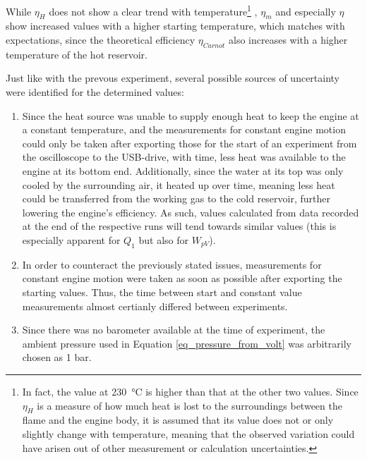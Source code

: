 \documentclass[titlepage]{article}
\begin{document}
While \(\eta_H\) does not show a clear trend with temperature\footnote{In fact, the value at 230~°C is higher than that at the other two values. Since \(\eta_H\) is a measure of how much heat is lost to the surroundings between the flame and the engine body, it is assumed that its value does not or only slightly change with temperature, meaning that the observed variation could have arisen out of other measurement or calculation uncertainties.}
, \(\eta_m\) and especially \(\eta\) show increased values with a higher starting temperature, which matches with expectations, since the theoretical efficiency \(\eta_{Carnot}\) also increases with a higher temperature of the hot reservoir.

Just like with the prevous experiment, several possible sources of uncertainty were identified for the determined values:
\begin{enumerate}
    \item Since the heat source was unable to supply enough heat to keep the engine at a constant temperature, and the measurements for constant engine motion could only be taken after exporting those for the start of an experiment from the oscilloscope to the USB-drive, with time, less heat was available to the engine at its bottom end. Additionally, since the water at its top was only cooled by the surrounding air, it heated up over time, meaning less heat could be transferred from the working gas to the cold reservoir, further lowering the engine's efficiency. As such, values calculated from data recorded at the end of the respective runs will tend towards similar values (this is especially apparent for \(Q_1\) but also for \(W_{pV}\)).
    \item In order to counteract the previously stated issues, measurements for constant engine motion were taken as soon as possible after exporting the starting values. Thus, the time between start and constant value measurements almost certianly differed between experiments.
    \item Since there was no barometer available at the time of experiment, the ambient pressure used in Equation \ref{eq_pressure_from_volt} was arbitrarily chosen as 1 bar.
\end{enumerate}
\end{document}
